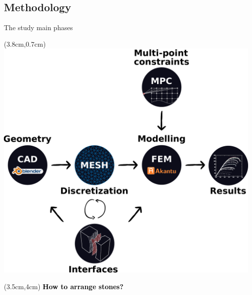 \documentclass{EESD}
\begin{document}
\subsection{Methodology}
\begin{frame}[t]{The study main phases}\vspace{10pt}
    \begin{textblock*}{13cm}(3.8cm,0.7cm)
        \includegraphics[height = 0.6\textwidth]{loop.pdf}
    \end{textblock*}
\end{frame}


\begin{frame}[t]{}
\begin{textblock*}{13cm}(3.5cm,4cm)
\Huge\textbf{\textcolor{black}{How to arrange stones?}}
\end{textblock*}
\end{frame}
\usebackgroundtemplate{}
\end{document}
